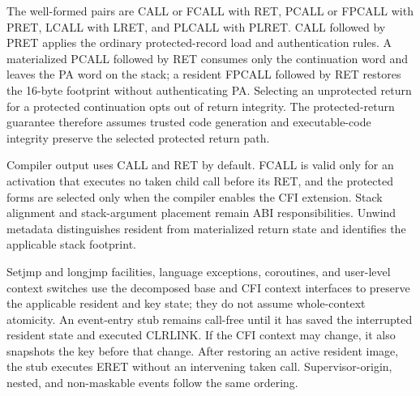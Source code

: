 The well-formed pairs are CALL or FCALL with RET, PCALL or FPCALL with PRET, LCALL with LRET, and PLCALL with PLRET. CALL followed by PRET applies the ordinary protected-record load and authentication rules. A materialized PCALL followed by RET consumes only the continuation word and leaves the PA word on the stack; a resident FPCALL followed by RET restores the 16-byte footprint without authenticating PA. Selecting an unprotected return for a protected continuation opts out of return integrity. The protected-return guarantee therefore assumes trusted code generation and executable-code integrity preserve the selected protected return path.

Compiler output uses CALL and RET by default. FCALL is valid only for an activation that executes no taken child call before its RET, and the protected forms are selected only when the compiler enables the CFI extension. Stack alignment and stack-argument placement remain ABI responsibilities. Unwind metadata distinguishes resident from materialized return state and identifies the applicable stack footprint.

Setjmp and longjmp facilities, language exceptions, coroutines, and user-level context switches use the decomposed base and CFI context interfaces to preserve the applicable resident and key state; they do not assume whole-context atomicity. An event-entry stub remains call-free until it has saved the interrupted resident state and executed CLRLINK. If the CFI context may change, it also snapshots the key before that change. After restoring an active resident image, the stub executes ERET without an intervening taken call. Supervisor-origin, nested, and non-maskable events follow the same ordering.
